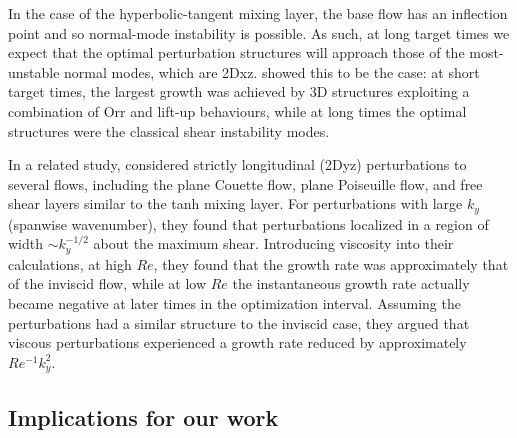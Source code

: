 \documentclass{article}
\begin{document}
In the case of the hyperbolic-tangent mixing layer, the base flow has an inflection point and so normal-mode instability is possible. As such, at long target times we expect that the optimal perturbation structures will approach those of the most-unstable normal modes, which are 2Dxz. \citet{Arratia2013a} showed this to be the case: at short target times, the largest growth was achieved by 3D structures exploiting a combination of Orr and lift-up behaviours, while at long times the optimal structures were the classical shear instability modes. 

In a related study, \citet{Arratia2013b} considered strictly longitudinal (2Dyz) perturbations to several flows, including the plane Couette flow, plane Poiseuille flow, and free shear layers similar to the tanh mixing layer. For perturbations with large $k_y$ (spanwise wavenumber), they found that perturbations localized in a region of width $\sim k_y^{-1/2}$ about the maximum shear. Introducing viscosity into their calculations, at high $Re$, they found that the growth rate was approximately that of the inviscid flow, while at low $Re$ the instantaneous growth rate actually became negative at later times in the optimization interval. Assuming the perturbations had a similar structure to the inviscid case, they argued that viscous perturbations experienced a growth rate reduced by approximately $Re^{-1}k_y^2$. 

\subsection{Implications for our work}
\end{document}
